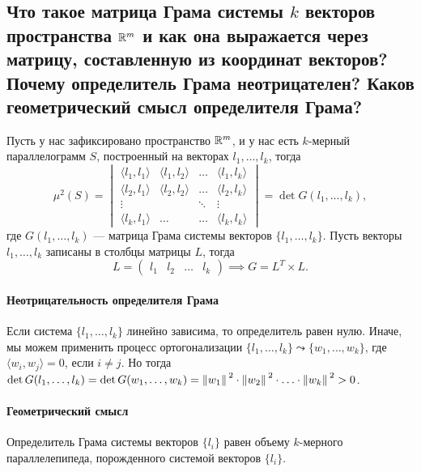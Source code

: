 
\subsection{Что такое матрица Грама системы $k$ векторов пространства $\mathbb{R}^{m}$ и как она выражается через матрицу, составленную из координат векторов? Почему определитель Грама неотрицателен? Каков геометрический смысл определителя Грама?}

Пусть у нас зафиксировано пространство $\mathbb{R}^{m}$, и у нас есть $k$-мерный параллелограмм $S$, построенный на векторах $l_{1}, \ldots, l_{k}$, тогда
\[
    \mu^{2}(S) = \begin{vmatrix}
        \langle l_{1}, l_{1} \rangle & \langle l_{1}, l_{2} \rangle & \ldots & \langle l_{1}, l_{k} \rangle \\
        \langle l_{2}, l_{1} \rangle & \langle l_{2}, l_{2} \rangle & \ldots & \langle l_{2}, l_{k} \rangle \\
        \vdots & & \ddots & \vdots \\
        \langle l_{k}, l_{1} \rangle & \ldots & \ldots & \langle l_{k}, l_{k} \rangle
    \end{vmatrix} = \det G(l_{1}, \ldots, l_{k}),
\]
где $G(l_{1}, \ldots, l_{k})$ --- матрица Грама системы векторов $\{l_{1}, \ldots, l_{k}\}$.
Пусть векторы $l_{1}, \ldots, l_{k}$ записаны в столбцы матрицы $L$, тогда
\[
    L = \begin{pmatrix}
        l_{1} & l_{2} & \ldots & l_{k}
    \end{pmatrix} \implies G = L^{T} \times L.
\]

\paragraph*{Неотрицательность определителя Грама}
Если система $\{l_{1}, \ldots, l_{k}\}$ линейно зависима, то определитель равен нулю.
Иначе, мы можем применить процесс ортогонализации $\{l_{1}, \ldots, l_{k}\} \leadsto \{w_{1}, \ldots, w_{k}\}$, где $\langle w_{i}, w_{j} \rangle = 0$, если $i \neq j$.
Но тогда $\det G(l_{1}, \ldots, l_{k}) = \det G(w_{1}, \ldots, w_{k}) = \norm{w_{1}}^{2} \cdot \norm{w_{2}}^{2} \cdot \ldots \cdot \norm{w_{k}}^{2} > 0$.

\paragraph{Геометрический смысл}
Определитель Грама системы векторов $\{l_{i}\}$ равен объему $k$-мерного параллелепипеда, порожденного системой векторов $\{ l_{i} \}$.